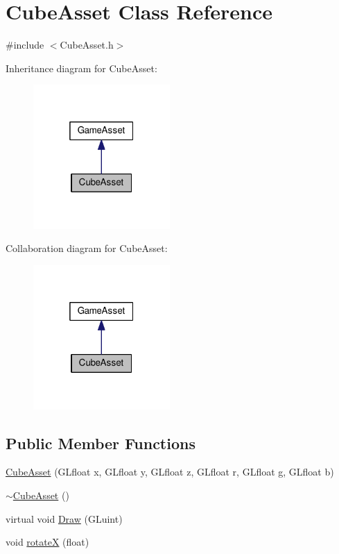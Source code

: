 \hypertarget{class_cube_asset}{}\section{Cube\+Asset Class Reference}
\label{class_cube_asset}


{\ttfamily \#include $<$Cube\+Asset.\+h$>$}



Inheritance diagram for Cube\+Asset\+:\nopagebreak
\begin{figure}[H]
\begin{center}
\leavevmode
\includegraphics[width=148pt]{class_cube_asset__inherit__graph}
\end{center}
\end{figure}


Collaboration diagram for Cube\+Asset\+:\nopagebreak
\begin{figure}[H]
\begin{center}
\leavevmode
\includegraphics[width=148pt]{class_cube_asset__coll__graph}
\end{center}
\end{figure}
\subsection*{Public Member Functions}
\begin{DoxyCompactItemize}
\item 
\hyperlink{class_cube_asset_a0cc99acd753a835e1d10be46cf8a0e5c}{Cube\+Asset} (G\+Lfloat x, G\+Lfloat y, G\+Lfloat z, G\+Lfloat r, G\+Lfloat g, G\+Lfloat b)
\item 
\hyperlink{class_cube_asset_ab3ab9a5da82cbf8537a28652410093b1}{$\sim$\+Cube\+Asset} ()
\item 
virtual void \hyperlink{class_cube_asset_a1af568486056e254ffcf98fd99947bfe}{Draw} (G\+Luint)
\item 
void \hyperlink{class_cube_asset_ad3bd98dd1b0a34b3dc4234913e41c3e5}{rotate\+X} (float)
\end{DoxyCompactItemize}
